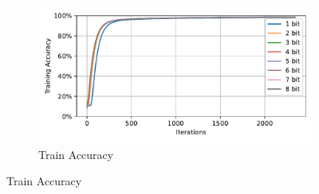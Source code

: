     \label{appendix:accuracy_curves_mnist}
        \begin{figure}[H]
            \centering
            \begin{subfigure}[H]{\textwidth}
                \centering
                \includegraphics[width=\textwidth]{../standard/MNIST/plots/mnist_train_acc.pdf}
                \caption{Train Accuracy}
            \end{subfigure}
        \end{figure}
